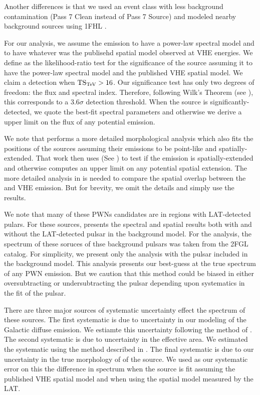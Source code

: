Another differences is that we used an event class with less background
contamination (Pass 7 Clean instead of Pass 7 Source) and modeled
nearby background sources using \ac{1FHL} \citep{ackermann_2013a_first-fermi-lat}.

For our analysis, we assume the \gev emission to have a power-law spectral
model and to have whatever was the publisehd spatial model observed at
\ac{VHE} energies.  We define \tstev as the likelihood-ratio test for the
significance of the source assuming it to have the power-law spectral
model and the published \ac{VHE} spatial model.  We claim a detection
when $\mathrm{TS}_\text{TeV} > 16$.  Our significance test has only two degrees of freedom:
the flux and spectral index.  Therefore, following Wilk's Theorem (see
), this corresponds to a $3.6\sigma$
detection threshold. When the source is significantly-detected, we quote
the best-fit spectral parameters and otherwise we derive a upper limit
on the flux of any potential emission.

We note that \cite{acero_2013a_constraints-galactic} performs a more
detailed morphological analysis which also fits the positions of the
sources assuming their emissions to be point-like and spatially-extended.
That work then uses \tsext (See ) to test
if the emission is spatially-extended and otherwise computes an upper
limit on any potential spatial extension.  The more detailed analysis in
\cite{acero_2013a_constraints-galactic} is needed to compare the spatial
overlap between the \gev and \ac{VHE} emission. But for brevity, we omit the
details and simply use the results.

We note that many of these \acp{PWN} candidates are
in regions with \ac{LAT}-detected pulars.  For these sources,
\cite{acero_2013a_constraints-galactic} presents the spectral and
spatial results both with and without the \ac{LAT}-detected pulsar in the
background model. For the analysis, the spectrum of these soruces of thse
background pulsars was taken from the \ac{2FGL} catalog.  For simplicity,
we present only the analysis with the pulsar included in the background
model. This analysis presents our best-guess at the true spectrum of
any \ac{PWN} emission.  But we caution that this method could be biased
in either oversubtracting or undersubtracting the pulsar depending upon
systematics in the fit of the pulsar.

There are three major sources of systematic uncertainty
effect the spectrum of these sources. The first systematic
is due to uncertainty in our modeling of the Galactic diffuse
emission.  We estiamte this uncertainty following the method of
.  The second systematic is due
to uncertainty in the effective area.  We estimated the systematic
using the method described in \cite{ackermann_2012a_fermi-large}.
The final systematic is due to our uncertainty in the true morphology of
of the source. We used as our systematic error on this the difference
in spectrum when the source is fit assuming the published \ac{VHE} spatial
model and when using the spatial model measured by the LAT.

